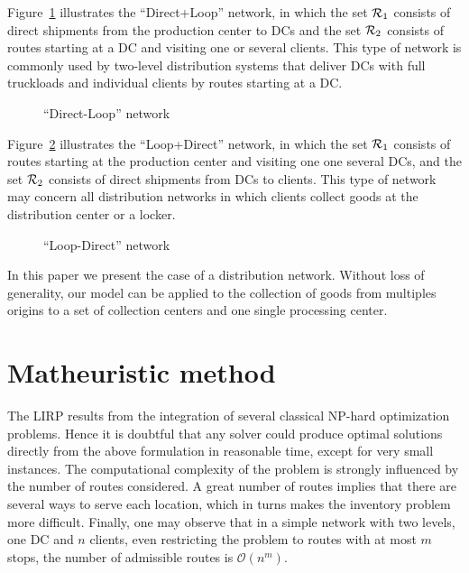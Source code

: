 \documentclass[a4paper,10pt]{article}
\begin{document}
\begin{linenumbers}
 Figure~\ref{fig:dl} illustrates the ``Direct+Loop'' network, in which the set $\mathcal{R}_1$ consists of direct shipments from the production center to DCs
 and the set $\mathcal{R}_2$ consists of routes starting at a DC and visiting one or several clients.  This type of network is commonly used by two-level distribution systems that deliver DCs with full truckloads and individual clients by routes starting at a DC.
 
 \begin{figure}[htbp]
    \centering
	\caption{ ``Direct-Loop'' network}
	  \label{fig:dl}
	
\end{figure}

Figure~\ref{fig:ld} illustrates the ``Loop+Direct'' network, in which the set $\mathcal{R}_1$  consists of routes starting at the production center and visiting one one several DCs, and the set $\mathcal{R}_2$ consists of direct shipments from DCs to clients. This type of network may concern all distribution networks in which clients collect goods at the distribution center or a locker. 

\begin{figure}[htbp]
	\centering
	\caption{``Loop-Direct'' network}
	\label{fig:ld}
	\end{figure}

In this paper we present the case of a distribution network. Without loss of generality, our model can be applied to the collection of goods from multiples origins to a set of collection centers and one single processing center. 



\section{Matheuristic method} 
\label{sec:algo}

The LIRP  results from the integration of several classical NP-hard optimization problems. 
Hence it is doubtful that any solver could produce optimal solutions directly from the above formulation in reasonable time, except for very small instances. The computational complexity of the problem is strongly influenced by the number of routes considered.
A great number of routes implies that there are several ways to serve each location, which in turns makes the inventory problem more difficult.
Finally, one may observe that in a simple network with two levels, one DC and $n$ clients, even restricting the problem to routes with at most $m$ stops, the number of admissible routes is $\mathcal{O}(n^m)$.


\end{linenumbers}
\end{document}

